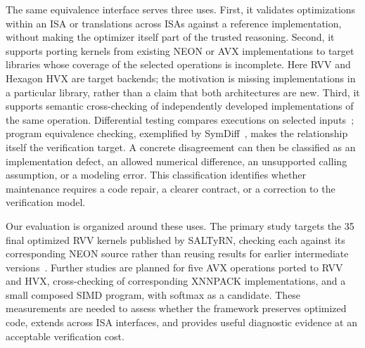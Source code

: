 The same equivalence interface serves three uses. First, it validates optimizations within an ISA or translations across ISAs against a reference implementation, without making the optimizer itself part of the trusted reasoning. Second, it supports porting kernels from existing NEON or AVX implementations to target libraries whose coverage of the selected operations is incomplete. Here RVV and Hexagon HVX are target backends; the motivation is missing implementations in a particular library, rather than a claim that both architectures are new. Third, it supports semantic cross-checking of independently developed implementations of the same operation. Differential testing compares executions on selected inputs~\cite{mckeeman}; program equivalence checking, exemplified by SymDiff~\cite{symdiff}, makes the relationship itself the verification target. A concrete disagreement can then be classified as an implementation defect, an allowed numerical difference, an unsupported calling assumption, or a modeling error. This classification identifies whether maintenance requires a code repair, a clearer contract, or a correction to the verification model.


Our evaluation is organized around these uses. The primary study targets the 35 final optimized RVV kernels published by SALTyRN, checking each against its corresponding NEON source rather than reusing results for earlier intermediate versions~\cite{final-kernels}. Further studies are planned for five AVX operations ported to RVV and HVX, cross-checking of corresponding XNNPACK implementations, and a small composed SIMD program, with softmax as a candidate.   These measurements are needed to assess whether the framework preserves optimized code, extends across ISA interfaces, and provides useful diagnostic evidence at an acceptable verification cost.
